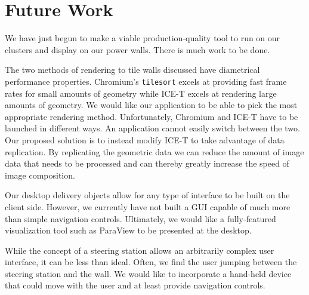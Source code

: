 \documentclass[twocolumn]{article}
\newcommand{\sticky}[1]{}
\newcommand{\cidentifier}[1]{\texttt{#1}}
\begin{document}
  \sticky{Comparison of rendering times of Chromium and ICE-T for various
  geometry sizes.  I would have it here already, but after a month I still
  don't have the Chromium stuff working on our cluster.  It's driving me
  nucking futs.}



  \section{Future Work}
  \label{sec:future_work}

  We have just begun to make a viable production-quality tool to run on our
  clusters and display on our power walls.  There is much work to be done.

  The two methods of rendering to tile walls discussed have diametrical
  performance properties.  Chromium's \cidentifier{tile\-sort} excels at
  providing fast frame rates for small amounts of geometry while ICE-T
  excels at rendering large amounts of geometry.  We would like our
  application to be able to pick the most appropriate rendering method.
  Unfortunately, Chromium and ICE-T have to be launched in different ways.
  An application cannot easily switch between the two.  Our proposed
  solution is to instead modify ICE-T to take advantage of data
  replication.  By replicating the geometric data we can reduce the amount
  of image data that needs to be processed and can thereby greatly increase
  the speed of image composition.

  Our desktop delivery objects allow for any type of interface to be built
  on the client side.  However, we currently have not built a GUI capable
  of much more than simple navigation controls.  Ultimately, we would like
  a fully-featured visualization tool such as ParaView \cite{Law01} to be
  presented at the desktop.

  While the concept of a steering station allows an arbitrarily complex
  user interface, it can be less than ideal.  Often, we find the user
  jumping between the steering station and the wall.  We would like to
  incorporate a hand-held device that could move with the user and at least
  provide navigation controls.
\end{document}

